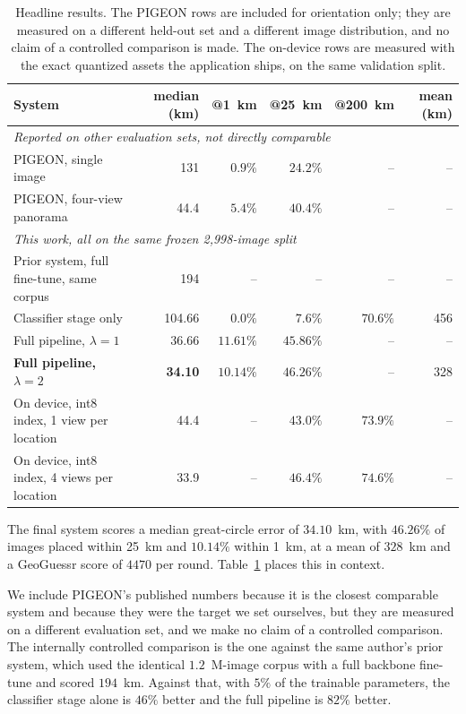 \documentclass[11pt,a4paper]{article}
\begin{document}
\begin{table}[t]
\centering
\footnotesize
\begin{tabular}{lrrrrr}
\toprule
System & median (km) & @1~km & @25~km & @200~km & mean (km) \\
\midrule
\multicolumn{6}{l}{\emph{Reported on other evaluation sets, not directly comparable}} \\
PIGEON, single image \cite{haas2024pigeon} & 131 & $0.9\%$ & $24.2\%$ & -- & -- \\
PIGEON, four-view panorama \cite{haas2024pigeon} & 44.4 & $5.4\%$ & $40.4\%$ & -- & -- \\
\midrule
\multicolumn{6}{l}{\emph{This work, all on the same frozen 2{,}998-image split}} \\
Prior system, full fine-tune, same corpus & 194 & -- & -- & -- & -- \\
Classifier stage only & 104.66 & $0.0\%$ & $7.6\%$ & $70.6\%$ & 456 \\
Full pipeline, $\lambda{=}1$ & 36.66 & $11.61\%$ & $45.86\%$ & -- & -- \\
\textbf{Full pipeline, $\lambda{=}2$} & \textbf{34.10} & $10.14\%$ & $\mathbf{46.26\%}$ & -- & 328 \\
On device, int8 index, 1 view per location & 44.4 & -- & $43.0\%$ & $73.9\%$ & -- \\
On device, int8 index, 4 views per location & 33.9 & -- & $46.4\%$ & $74.6\%$ & -- \\
\bottomrule
\end{tabular}
\caption{Headline results. The PIGEON rows are included for orientation only; they are
measured on a different held-out set and a different image distribution, and no claim of a
controlled comparison is made. The on-device rows are measured with the exact quantized
assets the application ships, on the same validation split.}
\label{tab:main}
\end{table}

The final system scores a median great-circle error of $34.10$~km, with $46.26\%$ of images
placed within 25~km and $10.14\%$ within 1~km, at a mean of $328$~km and a GeoGuessr score of
$4470$ per round. Table~\ref{tab:main} places this in context.

We include PIGEON's published numbers because it is the closest comparable system and because
they were the target we set ourselves, but they are measured on a different evaluation set,
and we make no claim of a controlled comparison. The internally controlled comparison is the
one against the same author's prior system, which used the identical $1.2$~M-image corpus with
a full backbone fine-tune and scored $194$~km. Against that, with $5\%$ of the trainable
parameters, the classifier stage alone is $46\%$ better and the full pipeline is $82\%$
better.
\end{document}
